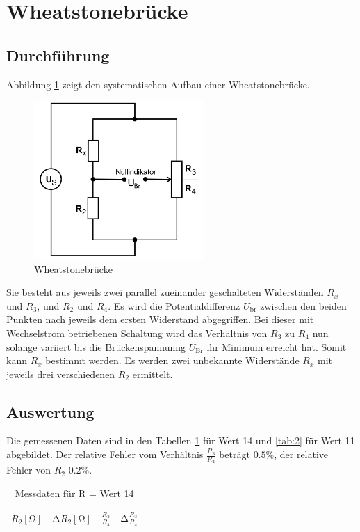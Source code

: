 \section{Wheatstonebrücke}
\subsection{Durchführung}
Abbildung \ref{fig:1} zeigt den systematischen Aufbau einer Wheatstonebrücke.
\begin{figure}[H]
  \centering
  \includegraphics[height=6cm]{wheat.png}
  \caption{Wheatstonebrücke \cite{sample}}
  \label{fig:1}
\end{figure}
Sie besteht aus jeweils zwei parallel zueinander geschalteten Widerständen $R_x$ und $R_3$, und $R_2$ und $R_4$.
Es wird die Potentialdifferenz $U_{\text{br}}$ zwischen den beiden Punkten nach jeweils dem ersten Widerstand abgegriffen.
Bei dieser mit Wechselstrom betriebenen Schaltung wird das Verhältnis von $R_3$ zu $R_4$ nun solange variiert bis die Brückenspannunng $U_{\text{Br}}$ ihr Minimum erreicht hat.
Somit kann $R_x$ bestimmt werden.
Es werden zwei unbekannte Widerstände $R_x$ mit jeweils drei verschiedenen $R_2$ ermittelt.
\subsection{Auswertung}
Die gemessenen Daten sind in den Tabellen \ref{tab:1} für Wert 14 und \ref{tab:2} für Wert 11 abgebildet.
Der relative Fehler vom Verhältnis $\frac{R_3}{R_4}$ beträgt $0.5\%$, der relative Fehler von $R_2$ $0.2\%$. \cite{sample}
\begin{table}
  \centering
  \caption{Messdaten für R = Wert 14}
  \label{tab:1}
  \begin{tabular}{c c c c}
    \toprule
    {$R_2 [\si{\ohm}]$} & {$\increment R_2 [\si{\ohm}]$} & {$\frac{R_3}{R_4}$} & {$\increment \frac{R_3}{R_4}$} \\
    \midrule
    
    \bottomrule
  \end{tabular}
\end{table}


